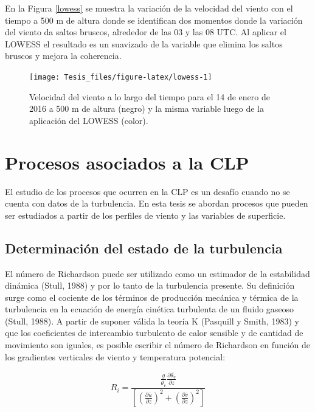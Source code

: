 \documentclass[12pt,spanish,oneside, a4paper]{book}
\begin{document}
En la Figura \ref{lowess} se muestra la variación de la velocidad del
viento con el tiempo a 500 m de altura donde se identifican dos momentos
donde la variación del viento da saltos bruscos, alrededor de las 03 y
las 08 UTC. Al aplicar el LOWESS el resultado es un suavizado de la
variable que elimina los saltos bruscos y mejora la coherencia.

\begin{figure}

{\centering \texttt{[image: Tesis\_files/figure-latex/lowess-1]} 

}

\caption{Velocidad del viento a lo largo del tiempo para el 14 de enero de 2016 a 500 m de altura (negro) y la misma variable luego de la aplicación del LOWESS (color). \label{lowess}}\label{fig:lowess}
\end{figure}

\section{Procesos asociados a la CLP}\label{procesos-asociados-a-la-clp}

El estudio de los procesos que ocurren en la CLP es un desafío cuando no
se cuenta con datos de la turbulencia. En esta tesis se abordan procesos
que pueden ser estudiados a partir de los perfiles de viento y las
variables de superficie.

\subsection{Determinación del estado de la
turbulencia}\label{determinacion-del-estado-de-la-turbulencia}

El número de Richardson puede ser utilizado como un estimador de la
estabilidad dinámica (Stull, 1988) y por lo tanto de la turbulencia
presente. Su definición surge como el cociente de los términos de
producción mecánica y térmica de la turbulencia en la ecuación de
energía cinética turbulenta de un fluido gaseoso (Stull, 1988). A partir
de suponer válida la teoría K (Pasquill y Smith, 1983) y que los
coeficientes de intercambio turbulento de calor sensible y de cantidad
de movimiento son iguales, es posible escribir el número de Richardson
en función de los gradientes verticales de viento y temperatura
potencial:

\begin{equation} \label{eq-ri1}
R_i = \frac{\frac{g}{\overline{\theta_v}} \frac{\partial \overline{\theta_v}}{\partial z}}
{\left [ \left (\frac{\partial \overline{u}}{\partial z} \right )^2 + \left (\frac{\partial \overline{v}}{\partial z} \right )^2  \right]}
\end{equation}
\end{document}
